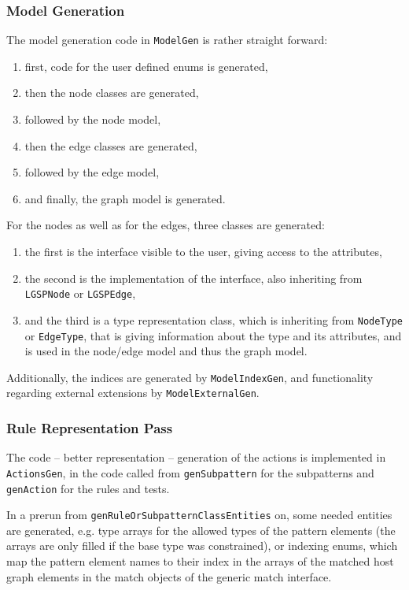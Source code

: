 \subsubsection*{Model Generation}

The model generation code in \texttt{ModelGen} is rather straight forward:
\begin{enumerate}
	\item first, code for the user defined enums is generated,
	\item then the node classes are generated,
	\item followed by the node model,
	\item then the edge classes are generated,
	\item followed by the edge model,
	\item and finally, the graph model is generated.
\end{enumerate}

\noindent For the nodes as well as for the edges, three classes are generated:
\begin{enumerate}
	\item the first is the interface visible to the user, giving access to the attributes,
	\item the second is the implementation of the interface, also inheriting from \texttt{LGSPNode} or \texttt{LGSPEdge},
	\item and the third is a type representation class, which is inheriting from \texttt{NodeType} or \texttt{EdgeType}, that is giving information about the type and its attributes, and is used in the node/edge model and thus the graph model.
\end{enumerate}

Additionally, the indices are generated by \texttt{Model\-Index\-Gen}, and functionality regarding external extensions by \texttt{Model\-External\-Gen}.

\subsubsection*{Rule Representation Pass}

The code -- better representation -- generation of the actions is implemented in \texttt{ActionsGen}, in the code called from \texttt{gen\-Subpattern} for the subpatterns and \texttt{gen\-Action} for the rules and tests.

In a prerun from \texttt{gen\-Rule\-Or\-Subpattern\-Class\-Entities} on, some needed entities are generated, e.g. type arrays for the allowed types of the pattern elements (the arrays are only filled if the base type was constrained), or indexing enums, which map the pattern element names to their index in the arrays of the matched host graph elements in the match objects of the generic match interface.

